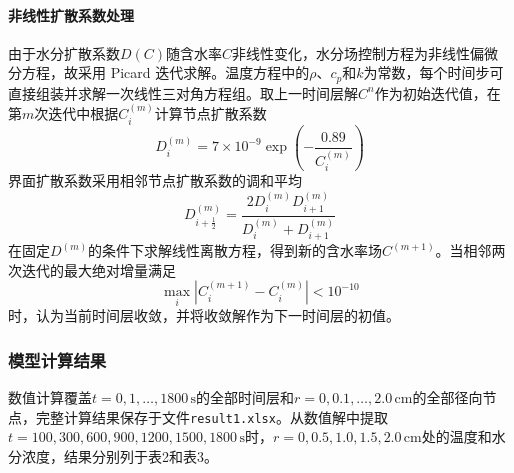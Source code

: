 \documentclass[withoutpreface,bwprint]{cumcmthesis}
\begin{document}
\paragraph{非线性扩散系数处理}
由于水分扩散系数$D(C)$随含水率$C$非线性变化，水分场控制方程为非线性偏微分方程，故采用 Picard 迭代求解。温度方程中的$\rho$、$c_p$和$k$为常数，每个时间步可直接组装并求解一次线性三对角方程组。取上一时间层解$C^n$作为初始迭代值，在第$m$次迭代中根据$C_i^{(m)}$计算节点扩散系数
\begin{equation}
D_i^{(m)}=7\times10^{-9}\exp\left(-\frac{0.89}{C_i^{(m)}}\right)
\label{eq:q1-picard-diffusivity}
\end{equation}
界面扩散系数采用相邻节点扩散系数的调和平均
\begin{equation}
D_{i+\frac12}^{(m)}
=\frac{2D_i^{(m)}D_{i+1}^{(m)}}{D_i^{(m)}+D_{i+1}^{(m)}}
\label{eq:q1-harmonic-diffusivity}
\end{equation}
在固定$D^{(m)}$的条件下求解线性离散方程，得到新的含水率场$C^{(m+1)}$。当相邻两次迭代的最大绝对增量满足
\begin{equation}
\max_i\left|C_i^{(m+1)}-C_i^{(m)}\right|<10^{-10}
\label{eq:q1-picard-convergence}
\end{equation}
时，认为当前时间层收敛，并将收敛解作为下一时间层的初值。


\subsubsection{模型计算结果}

数值计算覆盖$t=0,1,\ldots,1800\,\mathrm{s}$的全部时间层和$r=0,0.1,\ldots,2.0\,\mathrm{cm}$的全部径向节点，完整计算结果保存于文件\texttt{result1.xlsx}。从数值解中提取$t=100,300,600,900,1200,1500,1800\,\mathrm{s}$时，$r=0,0.5,1.0,1.5,2.0\,\mathrm{cm}$处的温度和水分浓度，结果分别列于表2和表3。
\end{document}
